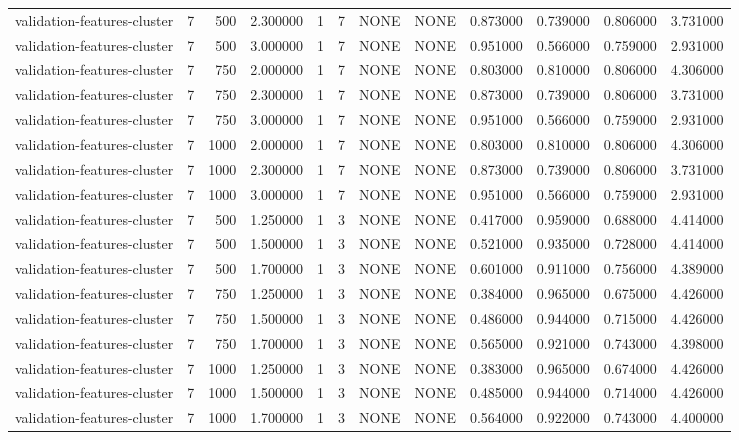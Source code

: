 \begin{tabular}{lrrrllllrrrr}
validation-features-cluster & 7 & 500 & 2.300000 & 1 & 7 & NONE & NONE & 0.873000 & 0.739000 & 0.806000 & 3.731000 \\
validation-features-cluster & 7 & 500 & 3.000000 & 1 & 7 & NONE & NONE & 0.951000 & 0.566000 & 0.759000 & 2.931000 \\
validation-features-cluster & 7 & 750 & 2.000000 & 1 & 7 & NONE & NONE & 0.803000 & 0.810000 & 0.806000 & 4.306000 \\
validation-features-cluster & 7 & 750 & 2.300000 & 1 & 7 & NONE & NONE & 0.873000 & 0.739000 & 0.806000 & 3.731000 \\
validation-features-cluster & 7 & 750 & 3.000000 & 1 & 7 & NONE & NONE & 0.951000 & 0.566000 & 0.759000 & 2.931000 \\
validation-features-cluster & 7 & 1000 & 2.000000 & 1 & 7 & NONE & NONE & 0.803000 & 0.810000 & 0.806000 & 4.306000 \\
validation-features-cluster & 7 & 1000 & 2.300000 & 1 & 7 & NONE & NONE & 0.873000 & 0.739000 & 0.806000 & 3.731000 \\
validation-features-cluster & 7 & 1000 & 3.000000 & 1 & 7 & NONE & NONE & 0.951000 & 0.566000 & 0.759000 & 2.931000 \\
validation-features-cluster & 7 & 500 & 1.250000 & 1 & 3 & NONE & NONE & 0.417000 & 0.959000 & 0.688000 & 4.414000 \\
validation-features-cluster & 7 & 500 & 1.500000 & 1 & 3 & NONE & NONE & 0.521000 & 0.935000 & 0.728000 & 4.414000 \\
validation-features-cluster & 7 & 500 & 1.700000 & 1 & 3 & NONE & NONE & 0.601000 & 0.911000 & 0.756000 & 4.389000 \\
validation-features-cluster & 7 & 750 & 1.250000 & 1 & 3 & NONE & NONE & 0.384000 & 0.965000 & 0.675000 & 4.426000 \\
validation-features-cluster & 7 & 750 & 1.500000 & 1 & 3 & NONE & NONE & 0.486000 & 0.944000 & 0.715000 & 4.426000 \\
validation-features-cluster & 7 & 750 & 1.700000 & 1 & 3 & NONE & NONE & 0.565000 & 0.921000 & 0.743000 & 4.398000 \\
validation-features-cluster & 7 & 1000 & 1.250000 & 1 & 3 & NONE & NONE & 0.383000 & 0.965000 & 0.674000 & 4.426000 \\
validation-features-cluster & 7 & 1000 & 1.500000 & 1 & 3 & NONE & NONE & 0.485000 & 0.944000 & 0.714000 & 4.426000 \\
validation-features-cluster & 7 & 1000 & 1.700000 & 1 & 3 & NONE & NONE & 0.564000 & 0.922000 & 0.743000 & 4.400000 \\

\end{tabular}
